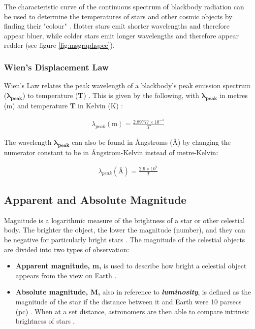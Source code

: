 \documentclass[12pt]{article}
\begin{document}
The characteristic curve of the continuous spectrum of blackbody radiation can be used to determine the temperatures of stars and other cosmic objects by finding their "colour" \cite{ESAblackbodyrad}.
Hotter stars emit shorter wavelengths and therefore appear bluer, while colder stars emit longer wavelengths and therefore appear redder (see figure \ref{fig:msgraphspec}).


\subsubsection{Wien's Displacement Law}

Wien's Law relates the peak wavelength of a blackbody's peak emission spectrum ($\mathbf{\lambda_{peak}}$) to temperature (\textbf{T}) \cite{derivwien}.
This is given by the following, with $\mathbf{\lambda_{peak}}$ in metres (m) and temperature \textbf{T} in Kelvin (K) \cite{derivwien}:

\vspace{-1.5ex}
\begin{gather}
    \lambda_{peak} (\text{m}) = \frac{2.89777 \times 10 ^{-3}}{T} 
\end{gather}

The wavelength $\mathbf{\lambda_{peak}}$ can also be found in Ångstroms (Å) by changing the numerator constant to be in Ångstrom-Kelvin instead of metre-Kelvin:

\vspace{-1.5ex}
\begin{gather}
    \lambda_{peak} (\text{\AA}) = \frac{2.9 \times 10^7}{T}
\end{gather}

\subsection{Apparent and Absolute Magnitude} \label{sec:1.1.3}

Magnitude is a logarithmic measure of the brightness of a star or other celestial body. The brighter the object, the lower the magnitude (number), and they can be negative for particularly bright stars
\cite{britmag}.
The magnitude of the celestial objects are divided into two types of observation:

\begin{itemize}
    \item \textbf{Apparent magnitude, m,} is used to describe how bright a celestial object appears from the view on Earth
    \cite{lcomag}.
    \item \textbf{Absolute magnitude, M,} also in reference to \textbf{\textit{luminosity}}, is defined as the magnitude of the star if the distance between it and Earth were 10 parsecs (pc)
    \cite{lcoabsmag,cosmosabsmag}.
    When at a set distance, astronomers are then able to compare intrinsic brightness of stars
    \cite{cosmosabsmag}.
\end{itemize}
\end{document}
